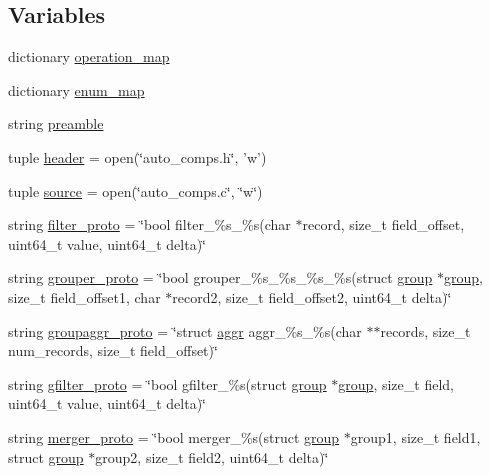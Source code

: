 \subsection*{\-Variables}
\begin{DoxyCompactItemize}
\item 
dictionary \hyperlink{namespacefun__gen_ab0aa9bb5cee4f4de9db0a8276db1fc7f}{operation\-\_\-map}
\item 
dictionary \hyperlink{namespacefun__gen_a3f0fc2c7eb9b8116260fdfe608911309}{enum\-\_\-map}
\item 
string \hyperlink{namespacefun__gen_ab2fbbcc4262280e33d3bd590dd2fc198}{preamble}
\item 
tuple \hyperlink{namespacefun__gen_a6ae1f74cc5476582c44a74abfd58b9da}{header} = open(\char`\"{}auto\-\_\-comps.\-h\char`\"{}, 'w')
\item 
tuple \hyperlink{namespacefun__gen_a731fe5a5826f22d63eb10f7b75e684aa}{source} = open(\char`\"{}auto\-\_\-comps.\-c\char`\"{}, \char`\"{}w\char`\"{})
\item 
string \hyperlink{namespacefun__gen_aeb238801eab5d97517c3bfecab2e88b8}{filter\-\_\-proto} = \char`\"{}bool filter\-\_\-\%s\-\_\-\%s(char $\ast$record, size\-\_\-t field\-\_\-offset, uint64\-\_\-t value, uint64\-\_\-t delta)\char`\"{}
\item 
string \hyperlink{namespacefun__gen_a73685c5a808b19d3a0d239c25fbf1bde}{grouper\-\_\-proto} = \char`\"{}bool grouper\-\_\-\%s\-\_\-\%s\-\_\-\%s\-\_\-\%s(struct \hyperlink{structgroup}{group} $\ast$\hyperlink{structgroup}{group}, size\-\_\-t field\-\_\-offset1, char $\ast$record2, size\-\_\-t field\-\_\-offset2, uint64\-\_\-t delta)\char`\"{}
\item 
string \hyperlink{namespacefun__gen_a28e6f18a249f700dbe6f13fcf12fd44a}{groupaggr\-\_\-proto} = \char`\"{}struct \hyperlink{structaggr}{aggr} aggr\-\_\-\%s\-\_\-\%s(char $\ast$$\ast$records, size\-\_\-t num\-\_\-records, size\-\_\-t field\-\_\-offset)\char`\"{}
\item 
string \hyperlink{namespacefun__gen_a009fbfb14aad3d2d0322096cd19691f9}{gfilter\-\_\-proto} = \char`\"{}bool gfilter\-\_\-\%s(struct \hyperlink{structgroup}{group} $\ast$\hyperlink{structgroup}{group}, size\-\_\-t field, uint64\-\_\-t value, uint64\-\_\-t delta)\char`\"{}
\item 
string \hyperlink{namespacefun__gen_aaea004d0d849466492a010a6a527388b}{merger\-\_\-proto} = \char`\"{}bool merger\-\_\-\%s(struct \hyperlink{structgroup}{group} $\ast$group1, size\-\_\-t field1, struct \hyperlink{structgroup}{group} $\ast$group2, size\-\_\-t field2, uint64\-\_\-t delta)\char`\"{}
\end{DoxyCompactItemize}



